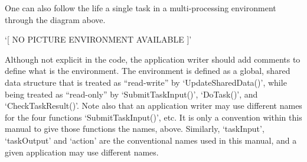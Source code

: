 One can also follow the life a single task in a multi-processing environment
through the diagram above.

`[ NO PICTURE ENVIRONMENT AVAILABLE ]'


Although not explicit in the code, the application writer should add
comments to define what is the environment.  The environment is
defined as a global, shared data structure that is treated as
``read-write'' by `UpdateSharedData()', while being treated as
``read-only'' by `SubmitTaskInput()', `DoTask()', and
`CheckTaskResult()'. Note also that an application
writer may use different names for the four functions
`SubmitTaskInput()', etc.  It is only a convention within this
manual to give those functions the names, above.  Similarly,
`taskInput', `taskOutput' and `action' are the
conventional names used in this manual, and a given application may
use different names.

